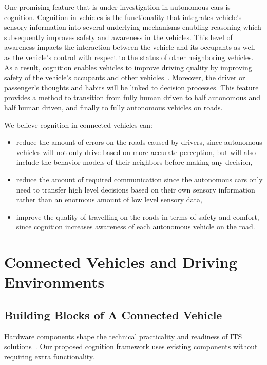 \documentclass[journal, 11pt]{IEEEtran}
\begin{document}
One promising feature that is under investigation in autonomous cars is
cognition. {\color{red} Cognition in vehicles is the functionality that
integrates vehicle's sensory information into several underlying mechanisms
enabling reasoning which subsequently improves safety and awareness in the
vehicles. This level of awareness impacts the interaction between the vehicle
and its occupants as well as the vehicle's control with respect to the
status of other neighboring vehicles. As a result,} cognition enables vehicles
to improve driving quality by improving safety of the vehicle's occupants and
other vehicles~\cite{cogcar}. Moreover, the driver or passenger's thoughts and
habits will be linked to decision processes. This feature provides a method to
transition from fully human driven to half autonomous and half human driven, and
finally to fully autonomous vehicles on roads.

We believe cognition in connected vehicles can:

\begin{itemize}
  \item reduce the amount of errors on the roads caused by drivers, since
  autonomous vehicles will not only drive based on more accurate perception, but
  will also include the behavior models of their neighbors before making any
  decision,
  \item reduce the amount of required communication since the autonomous cars
  only need to transfer high level decisions based on their own sensory
  information rather than an enormous amount of low level sensory data,
  \item improve the quality of travelling on the roads in terms of safety and
  comfort, since cognition increases awareness of each autonomous vehicle on the
  road.
\end{itemize} 

\section{Connected Vehicles and Driving Environments}

\subsection{Building Blocks of A Connected Vehicle}

Hardware components shape the technical practicality and readiness of ITS
solutions~\cite{hardingNHTSA14}. Our proposed cognition framework uses existing
components without requiring extra functionality. 
\end{document}
